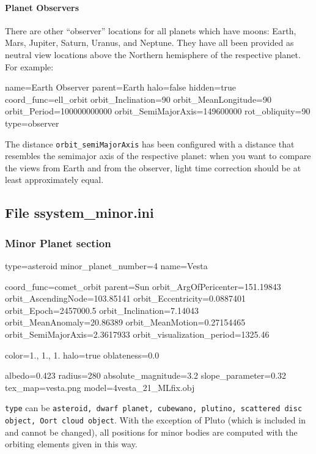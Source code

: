 \paragraph{Planet Observers}
\label{sec:ssystem.ini:PlanetObserver}

There are other ``observer'' locations for all planets  which have moons: Earth, Mars, Jupiter, Saturn, Uranus, and Neptune.
They have all been provided as neutral view locations above the Northern hemisphere of
the respective planet. For example:
\begin{configfile}
name=Earth Observer
parent=Earth
halo=false
hidden=true
coord_func=ell_orbit
orbit_Inclination=90
orbit_MeanLongitude=90
orbit_Period=100000000000
orbit_SemiMajorAxis=149600000
rot_obliquity=90
type=observer
\end{configfile}

The distance \texttt{orbit\_semiMajorAxis} has been configured with a
distance that resembles the semimajor axis of the respective planet:
when you want to compare the views from Earth and from the observer,
light time correction should be at least approximately equal.

\subsection{File ssystem\_minor.ini}
\label{sec:ssystem.ini:minor}

\subsubsection{Minor Planet section}
\label{sec:ssystem.ini:MinorPlanet}

\begin{configfile}
[4vesta]
type=asteroid  
minor_planet_number=4
name=Vesta

coord_func=comet_orbit
parent=Sun
orbit_ArgOfPericenter=151.19843
orbit_AscendingNode=103.85141
orbit_Eccentricity=0.0887401
orbit_Epoch=2457000.5
orbit_Inclination=7.14043
orbit_MeanAnomaly=20.86389
orbit_MeanMotion=0.27154465
orbit_SemiMajorAxis=2.3617933
orbit_visualization_period=1325.46

color=1., 1., 1.
halo=true
oblateness=0.0

albedo=0.423
radius=280
absolute_magnitude=3.2
slope_parameter=0.32
tex_map=vesta.png
model=4vesta_21_MLfix.obj
\end{configfile}

\texttt{type} can be \texttt{asteroid, dwarf planet, cubewano,
  plutino, scattered disc object, Oort cloud object}. With the
exception of Pluto (which is included in  and cannot be changed), 
all positions for minor bodies are computed with the orbiting elements given in this way. 

